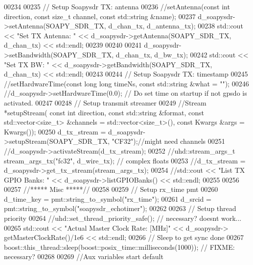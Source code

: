 \begin{DoxyCode}
00234 
00235       \textcolor{comment}{// Setup Soapysdr TX: antenna}
00236       \textcolor{comment}{//setAntenna(const int direction, const size\_t channel, const std::string &name);}
00237       d_soapysdr->setAntenna(SOAPY_SDR_TX, d_chan_tx, d_antenna_tx);
00238       std::cout << \textcolor{stringliteral}{"Set TX Antenna: "}  << d_soapysdr->getAntenna(SOAPY_SDR_TX, 
      d_chan_tx) << std::endl;
00239 
00240 
00241       d_soapysdr->setBandwidth(SOAPY_SDR_TX, d_chan_tx, d_bw_tx);
00242       std::cout << \textcolor{stringliteral}{"Set TX BW: "}  << d_soapysdr->getBandwidth(SOAPY_SDR_TX, 
      d_chan_tx) << std::endl;
00243 
00244       \textcolor{comment}{// Setup Soapysdr TX: timestamp}
00245       \textcolor{comment}{//setHardwareTime(const long long timeNs, const std::string &what = "");}
00246       \textcolor{comment}{//d\_soapysdr->setHardwareTime(0.0); // Do set time on startup if not gpsdo is activated.}
00247 
00248       \textcolor{comment}{// Setup transmit streamer}
00249       \textcolor{comment}{//Stream *setupStream( const int direction, const std::string &format, const std::vector<size\_t>
       &channels = std::vector<size\_t>(), const Kwargs &args = Kwargs());}
00250       d_tx_stream = d_soapysdr->setupStream(SOAPY_SDR_TX, \textcolor{stringliteral}{"CF32"});\textcolor{comment}{//might need channels}
00251       \textcolor{comment}{//d\_soapysdr->activateStream(d\_tx\_stream);}
00252       \textcolor{comment}{//uhd::stream\_args\_t stream\_args\_tx("fc32", d\_wire\_tx); // complex floats}
00253       \textcolor{comment}{//d\_tx\_stream = d\_soapysdr->get\_tx\_stream(stream\_args\_tx);}
00254       \textcolor{comment}{//std::cout << "List TX GPIO Banks: " << d\_soapysdr->listGPIOBanks() << std::endl;}
00255 
00256 
00257       \textcolor{comment}{//***** Misc *****//}
00258 
00259       \textcolor{comment}{// Setup rx\_time pmt}
00260       d_time_key = pmt::string\_to\_symbol(\textcolor{stringliteral}{"rx\_time"});
00261       d_srcid = pmt::string\_to\_symbol(\textcolor{stringliteral}{"soapysdr\_echotimer"});
00262 
00263       \textcolor{comment}{// Setup thread priority}
00264       \textcolor{comment}{//uhd::set\_thread\_priority\_safe(); // necessary? doesnt work...}
00265       std::cout << \textcolor{stringliteral}{"Actual Master Clock Rate: [MHz]"} << d_soapysdr->
      getMasterClockRate()/1e6 << std::endl;
00266       \textcolor{comment}{// Sleep to get sync done}
00267       boost::this_thread::sleep(boost::posix\_time::milliseconds(1000)); \textcolor{comment}{// FIXME: necessary?}
00268 
00269       \textcolor{comment}{//Aux variables start default}

\end{DoxyCode}
